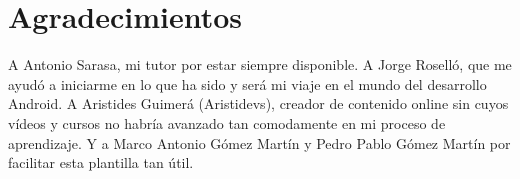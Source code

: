 
\chapter*{Agradecimientos}

A Antonio Sarasa, mi tutor por estar siempre disponible. A Jorge Roselló, que me ayudó a iniciarme en lo que ha sido y será mi viaje en el mundo del desarrollo Android. A Aristides Guimerá (Aristidevs), creador de contenido online sin cuyos vídeos y cursos no habría avanzado tan comodamente en mi proceso de aprendizaje. Y a Marco Antonio Gómez Martín y Pedro Pablo Gómez Martín por facilitar esta plantilla tan útil.











